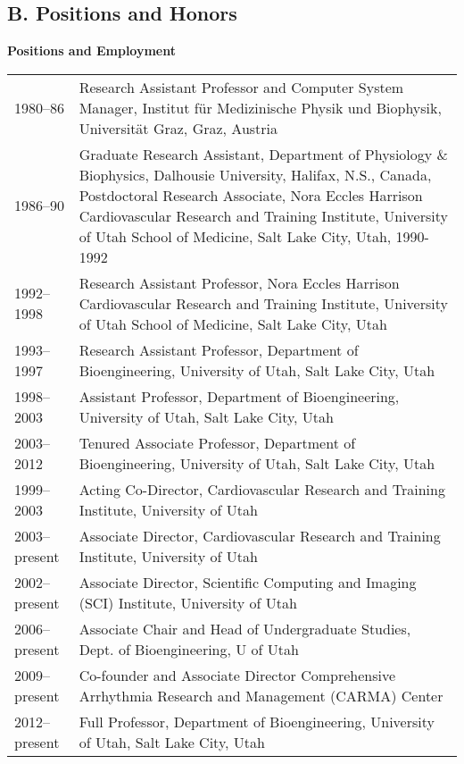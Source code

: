 \documentclass[10pt]{article}
\begin{document}
\noindent


\nocite{RSM:Ran2014,RSM:Par2014,RSM:Ran2012,RSM:Dos2013}

\subsection*{B. Positions and Honors}
\vspace{-.1in}

\noindent
\textbf{Positions and Employment}\\
\begin{tabular}[h]{lp{6.1in}}
    1980--86 & Research Assistant Professor and Computer System Manager,
    Institut f\"ur Medizinische Physik und Biophysik, Universit\"at Graz, Graz,
    Austria \\
    1986--90 & Graduate Research Assistant, Department of Physiology \&
    Biophysics, Dalhousie University, Halifax, N.S., Canada, Postdoctoral
    Research Associate, Nora Eccles Harrison Cardiovascular Research and
    Training Institute, University of Utah School of Medicine, Salt Lake
    City, Utah, 1990-1992 \\
    1992--1998 & Research Assistant Professor, Nora Eccles Harrison
    Cardiovascular Research and Training Institute, University of Utah
    School of Medicine, Salt Lake City, Utah\\
    1993--1997 & Research Assistant Professor, Department of
    Bioengineering, University of Utah, Salt Lake City, Utah \\
    1998--2003 & Assistant Professor, Department of Bioengineering,
    University of Utah, Salt Lake City, Utah \\
    2003--2012 & Tenured Associate Professor, Department of
    Bioengineering, University of Utah, Salt Lake City, Utah \\
    1999--2003 & Acting Co-Director, Cardiovascular Research and Training
    Institute, University of Utah  \\
    2003--present & Associate Director, Cardiovascular Research and Training
    Institute, University of Utah \\
    2002--present & Associate Director, Scientific Computing and Imaging
    (SCI) Institute, University of Utah \\
    2006--present & Associate Chair and Head of Undergraduate Studies,
    Dept. of Bioengineering, U of Utah \\
    2009--present & Co-founder and Associate Director Comprehensive
    Arrhythmia Research and Management (CARMA) Center \\
    2012--present & Full  Professor, Department of
    Bioengineering, University of Utah, Salt Lake City, Utah \\
\end{tabular}
\end{document}
